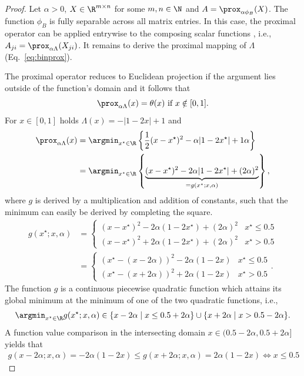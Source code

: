 \begin{proof}
Let $\alpha>0$, $X\in\R^{m\times n}$ for some $m,n\in\N$ and $A=\prox_{\alpha\phi_B}(X)$. The function $\phi_B$ is fully separable across all matrix entries. In this case, the proximal operator can be applied entrywise to the composing scalar functions \citep{parikh2014proximal}, i.e., $A_{ji}=\prox_{\alpha\Lambda}(X_{ji})$. It remains to derive the proximal mapping of $\Lambda$ (Eq.~\eqref{eq:binprox}).

The proximal operator reduces to Euclidean projection if the argument lies outside of the function's domain \citep{parikh2014proximal} and it follows that
\[\prox_{\alpha\Lambda}(x)=\theta(x) \text{ if } x\notin[0,1].\]
For $x\in[0,1]$ holds $\Lambda(x)=-|1-2x|+1$ and
\begin{align*}
  \prox_{\alpha\Lambda}(x) &= \argmin_{x^\star\in\R} \left\{\frac{1}{2}(x-x^\star)^2-\alpha|1-2x^\star| +1\alpha\right\}\\
  &= \argmin_{x^\star\in\R} \left\{\underbrace{(x-x^\star)^2-2\alpha|1-2x^\star| +(2\alpha)^2}_{=g(x^\star;x,\alpha)}\right\},
\end{align*}
where $g$ is derived by a multiplication and addition of constants, such that the minimum can easily be derived by completing the square.
\begin{align*}
  g(x^\star;x,\alpha) &=\begin{cases}
    (x-x^\star)^2  -2\alpha(1-2 x^\star) +(2\alpha)^2 & x^\star \leq 0.5\\
    (x-x^\star)^2 +2\alpha(1-2 x^\star) +(2\alpha)^2 & x^\star> 0.5
  \end{cases}\\
  &=
  \begin{cases}
    (x^\star-(x-2\alpha))^2 -2\alpha( 1-2x)& x^\star \leq 0.5\\
    (x^\star-(x+2\alpha))^2 +2\alpha( 1-2x) & x^\star> 0.5
  \end{cases}.
\end{align*}
The function $g$ is a continuous piecewise quadratic function which attains its global minimum at the minimum of one of the two quadratic functions, i.e.,
\[
  \argmin_{x^\star\in\R}g(x^\star;x,\alpha) \in \{x-2\alpha\mid x\leq 0.5+2\alpha\}\cup \{x+2\alpha\mid x> 0.5-2\alpha\}.
\] 
A function value comparison in the intersecting domain $x\in(0.5-2\alpha,0.5+2\alpha]$ yields that
\begin{align*}
g(x-2\alpha;x,\alpha)=-2\alpha(1-2x)\leq g(x+2\alpha;x,\alpha) =2\alpha(1-2x) \Leftrightarrow x\leq 0.5
\end{align*}
\end{proof}
